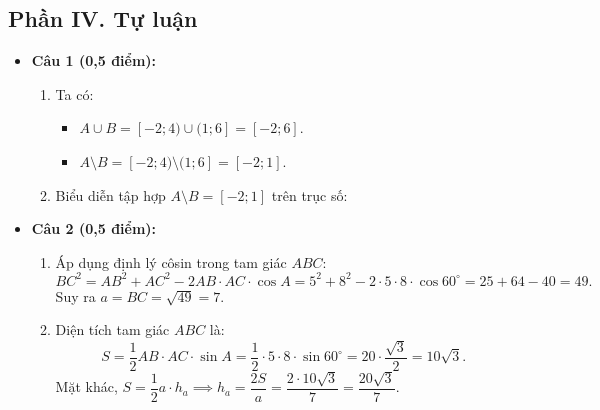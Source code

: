 \documentclass[12pt,a4paper]{article}
\begin{document}
\subsection*{Phần IV. Tự luận}
\begin{itemize}[leftmargin=0.6cm, itemsep=4pt]
\item \textbf{Câu 1 (0,5 điểm):}
\begin{enumerate}
    \item Ta có:
    \begin{itemize}
        \item $A \cup B = [-2; 4) \cup (1; 6] = [-2; 6]$.
        \item $A \setminus B = [-2; 4) \setminus (1; 6] = [-2; 1]$.
    \end{itemize}
    \item Biểu diễn tập hợp $A \setminus B = [-2; 1]$ trên trục số:
    \begin{center}
    \end{center}
\end{enumerate}

\item \textbf{Câu 2 (0,5 điểm):}
\begin{enumerate}
    \item Áp dụng định lý côsin trong tam giác $ABC$:
    \[
    BC^2 = AB^2 + AC^2 - 2AB\cdot AC\cdot\cos A = 5^2 + 8^2 - 2\cdot 5\cdot 8\cdot\cos 60^\circ = 25 + 64 - 40 = 49.
    \]
    Suy ra $a = BC = \sqrt{49} = 7$.
    \item Diện tích tam giác $ABC$ là:
    \[
    S = \dfrac{1}{2}AB\cdot AC\cdot\sin A = \dfrac{1}{2}\cdot 5\cdot 8\cdot\sin 60^\circ = 20\cdot\dfrac{\sqrt{3}}{2} = 10\sqrt{3}.
    \]
    Mặt khác, $S = \dfrac{1}{2}a\cdot h_a \implies h_a = \dfrac{2S}{a} = \dfrac{2\cdot 10\sqrt{3}}{7} = \dfrac{20\sqrt{3}}{7}$.
\end{enumerate}


\end{itemize}
\end{document}
